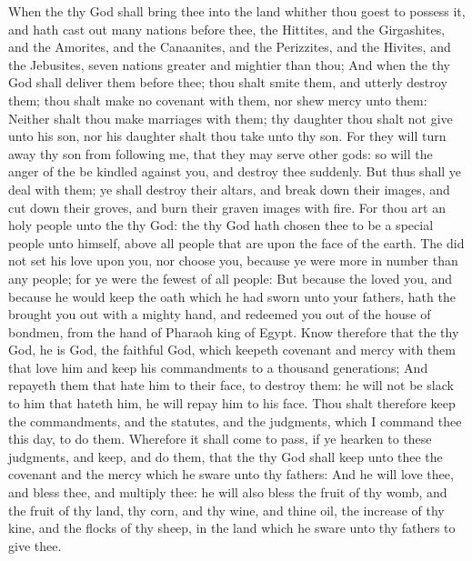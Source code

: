 \begin{biblechapter} %
 When the \LORD thy God shall bring thee into the land whither thou goest to possess it, and hath cast out many nations before thee, the Hittites, and the Girgashites, and the Amorites, and the Canaanites, and the Perizzites, and the Hivites, and the Jebusites, seven nations greater and mightier than thou;
\verse And when the \LORD thy God shall deliver them before thee; thou shalt smite them, and utterly destroy them; thou shalt make no covenant with them, nor shew mercy unto them:
\verse Neither shalt thou make marriages with them; thy daughter thou shalt not give unto his son, nor his daughter shalt thou take unto thy son.
\verse For they will turn away thy son from following me, that they may serve other gods: so will the anger of the \LORD be kindled against you, and destroy thee suddenly.
\verse But thus shall ye deal with them; ye shall destroy their altars, and break down their images, and cut down their groves, and burn their graven images with fire.
\verse For thou art an holy people unto the \LORD thy God: the \LORD thy God hath chosen thee to be a special people unto himself, above all people that are upon the face of the earth.
\verse The \LORD did not set his love upon you, nor choose you, because ye were more in number than any people; for ye were the fewest of all people:
\verse But because the \LORD loved you, and because he would keep the oath which he had sworn unto your fathers, hath the \LORD brought you out with a mighty hand, and redeemed you out of the house of bondmen, from the hand of Pharaoh king of Egypt.
\verse Know therefore that the \LORD thy God, he is God, the faithful God, which keepeth covenant and mercy with them that love him and keep his commandments to a thousand generations;
\verse And repayeth them that hate him to their face, to destroy them: he will not be slack to him that hateth him, he will repay him to his face.
\verse Thou shalt therefore keep the commandments, and the statutes, and the judgments, which I command thee this day, to do them.
\verse Wherefore it shall come to pass, if ye hearken to these judgments, and keep, and do them, that the \LORD thy God shall keep unto thee the covenant and the mercy which he sware unto thy fathers:
\verse And he will love thee, and bless thee, and multiply thee: he will also bless the fruit of thy womb, and the fruit of thy land, thy corn, and thy wine, and thine oil, the increase of thy kine, and the flocks of thy sheep, in the land which he sware unto thy fathers to give thee.

\end{biblechapter}
